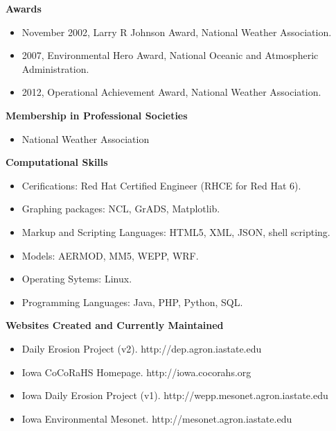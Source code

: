 \normalsize \sf
\Large \bf Awards\\
\normalsize \sf
\begin{itemize}
\item November 2002, Larry R Johnson Award, National Weather Association.
\item 2007, Environmental Hero Award, National Oceanic and Atmospheric Administration.
\item 2012, Operational Achievement Award, National Weather Association.
\end{itemize}
\Large \bf Membership in Professional Societies\\
\normalsize \sf	
\begin{itemize}
\item National Weather Association
\end{itemize}
\Large \bf Computational Skills\\
\normalsize \sf
\begin{itemize}
\item Cerifications: Red Hat Certified Engineer (RHCE for Red Hat 6).
\item Graphing packages: NCL, GrADS, Matplotlib.
\item Markup and Scripting Languages: HTML5, XML, JSON, shell scripting.
\item Models: AERMOD, MM5, WEPP, WRF.
\item Operating Sytems: Linux.
\item Programming Languages: Java, PHP, Python, SQL.
\end{itemize} 
\Large \bf Websites Created and Currently Maintained\\
\normalsize \sf
\begin{itemize}
\item Daily Erosion Project (v2). http://dep.agron.iastate.edu
\item Iowa CoCoRaHS Homepage. http://iowa.cocorahs.org
\item Iowa Daily Erosion Project (v1). http://wepp.mesonet.agron.iastate.edu
\item Iowa Environmental Mesonet. http://mesonet.agron.iastate.edu
\end{itemize}
\pagebreak

